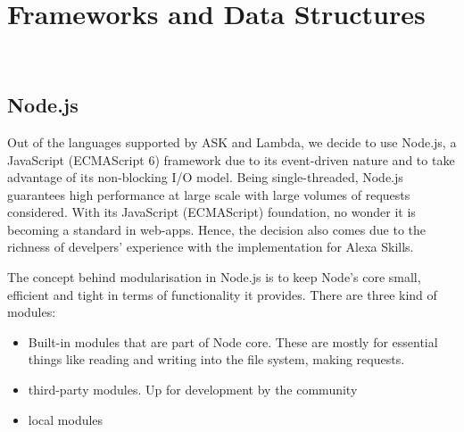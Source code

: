 \section{Frameworks and Data Structures}~\label{frameworks_structs}


\subsection*{Node.js}
\label{nodejs:def}
Out of the languages supported by ASK and Lambda, we decide to use Node.js, a JavaScript (ECMAScript 6) framework due to its event-driven nature and to take advantage of its non-blocking I/O model. Being single-threaded, Node.js guarantees high performance at large scale with large volumes of requests considered. With its JavaScript (ECMAScript) foundation, no wonder it is becoming a standard in web-apps. Hence, the decision also comes due to the richness of develpers' experience with the implementation for Alexa Skills.

The concept behind modularisation in Node.js is to keep Node's core small, efficient and tight in terms of functionality it provides. There are three kind of modules:

\begin{itemize}
\item Built-in modules that are part of Node core. These are mostly for essential things like reading and writing into the file system, making requests.

\item third-party modules. Up for development by the community

\item local modules

\end{itemize}




